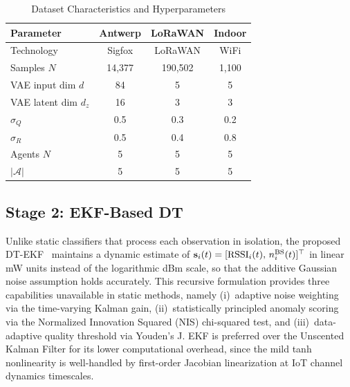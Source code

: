 \documentclass[conference]{IEEEtran}
\begin{document}
\begin{table}[h!]
\centering
\caption{Dataset Characteristics and Hyperparameters}
\label{tab:config}
\setlength{\tabcolsep}{3pt}
\begin{tabular}{lccc}
\toprule
\textbf{Parameter} & \textbf{Antwerp} & \textbf{LoRaWAN} & \textbf{Indoor}\\
\midrule
Technology           & Sigfox  & LoRaWAN & WiFi   \\
Samples $N$          & 14,377  & 190,502 & 1,100  \\
VAE input dim $d$    & 84      & 5       & 5      \\
VAE latent dim $d_z$ & 16      & 3       & 3      \\
$\sigma_Q$           & 0.5     & 0.3     & 0.2    \\
$\sigma_R$           & 0.5     & 0.4     & 0.8    \\
Agents $N$           & 5       & 5       & 5      \\
$|\mathcal{A}|$      & 5       & 5       & 5      \\
\bottomrule
\end{tabular}
\end{table}

\vspace{-6pt}
\subsection{Stage 2: EKF-Based DT}
\label{sec:dt}

Unlike static classifiers that process each observation in isolation,
the proposed DT-EKF~\cite{ref_ekf} maintains a dynamic estimate of
$\mathbf{s}_i(t)=[{\rm RSSI}_i(t),\,n^{\rm BS}_i(t)]^\top$
in linear mW units instead of the logarithmic dBm scale, so that the additive Gaussian noise assumption holds accurately.
This recursive formulation provides three capabilities unavailable in static methods, namely
(i)~adaptive noise weighting via the time-varying Kalman gain,
(ii)~statistically principled anomaly scoring via the Normalized Innovation Squared (NIS) chi-squared test,
and (iii)~data-adaptive quality threshold via Youden's J.
EKF is preferred over the Unscented Kalman Filter for its lower computational
overhead, since the mild tanh nonlinearity is well-handled by first-order Jacobian
linearization at IoT channel dynamics timescales.
\end{document}
